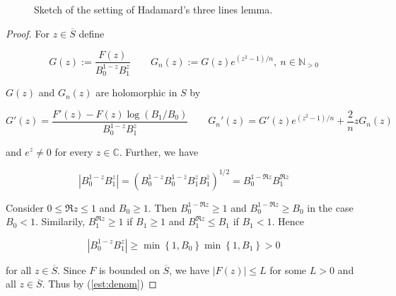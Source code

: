 \begin{figure}[h!tb]
	\centering
	\caption{Sketch of the setting of Hadamard's three lines lemma.}
	\label{fig:Hadamards_three_lines_lemma}
\end{figure}

\begin{proof}
For $z \in \overline{S}$ define 

\begin{equation*}
	G(z) := \frac{F(z)}{B_0^{1 - z}B_1^z} \qquad G_n(z) := G(z) e^{\left(z^2 - 1\right)/n},~n \in\mathbb{N}_{>0}
\end{equation*}

$G(z)$ and $G_n(z)$ are holomorphic in $S$ by
	
\begin{equation*}
	G'(z) = \frac{F'(z) - F(z)\log\left( B_1/B_0 \right)}{B_0^{1 - z}B_1^z} \qquad G_n'(z) = G'(z)e^{\left( z^2 - 1 \right)/n} + \frac{2}{n}zG_n(z)	
\end{equation*}

\noindent and $e^z \neq 0$ for every $z \in \mathbb{C}$. Further, we have

\begin{equation*}
		\left| B_0^{1 - z}B_1^z \right| = \left(B_0^{1 - z}B_0^{1 - \overline{z}} B_1^z B_1^{\overline{z}}\right)^{1/2} =  B_0^{1 -\Re z}B_1^{\Re z}
\end{equation*}

Consider $0 \leq \Re z \leq 1$ and $B_0 \geq 1$. Then $B_0^{1 - \Re z} \geq 1$ and $B_0^{1 - \Re z } \geq B_0$ in the case $B_0 < 1$. Similarily, $B_1^{\Re z} \geq 1$ if $B_1 \geq 1$ and $B_1^{\Re z} \leq B_1$ if $B_1 < 1$. Hence 

\begin{equation}
	\left| B_0^{1 - z}B_1^z \right| \geq \min\left\{1,B_0\right\}\min\left\{1,B_1\right\} > 0
	\label{est:denom}
\end{equation}

\noindent for all $z \in \overline{S}$. Since $F$ is bounded on $\overline{S}$, we have $\left| F(z) \right| \leq L$ for some $L > 0$ and all $z \in \overline{S}$. Thus by (\ref{est:denom})


\end{proof}
